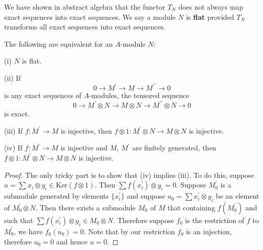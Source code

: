 We have shown in abstract algebra that the functor $T_N$ does not always map exact sequences into exact sequences. We say a module $N$ is \textbf{flat} provided $T_N$ transforms all exact sequences into exact sequences.
\begin{proposition}
The following are equivalent for an $A$-module $N$:\par
(i) $N$ is flat.\par
(ii) If 
$$0\longrightarrow M^\prime\longrightarrow M\longrightarrow M^{\prime\prime}\longrightarrow 0$$
is any exact sequences of $A$-modules, the tensored sequence 
$$
0\longrightarrow M^{\prime}\otimes N\longrightarrow M\otimes N\longrightarrow M^{\prime\prime}\otimes N\longrightarrow 0
$$
is exact.\par
(iii) If $f:M^\prime\to M$ is injective, then $f\otimes 1:M^\prime\otimes N\to M\otimes N$ is injective.\par
(iv) If $f:M^\prime\to M$ is injective and $M$, $M^\prime$ are finitely generated, then $f\otimes 1:M^\prime\otimes N\to M\otimes N$ is injective.
\end{proposition}
\begin{proof}
The only tricky part is to show that (iv) implies (iii). To do this, suppose $u=\sum x_i\otimes y_i\in\mathrm{Ker}(f\otimes 1)$. Then $\sum f(x_i^\prime)\otimes y_i=0$. Suppose $M_0^\prime$ is a submodule generated by elements $\{x_i^\prime\}$ and suppose $u_0=\sum x_i^\prime\otimes y_i$ be an element of $M_0^\prime\otimes N$. Then there exists a submodule $M_0$ of $M$ that containing $f(M_0^\prime)$ and such that $\sum f(x_i^\prime)\otimes y_i\in M_0\otimes N$. Therefore suppose $f_0$ is the restriction of $f$ to $M_0^\prime$, we have $f_0(u_0)=0$. Note that by our restriction $f_0$ is an injection, therefore $u_0=0$ and hence $u=0$.
\end{proof}
